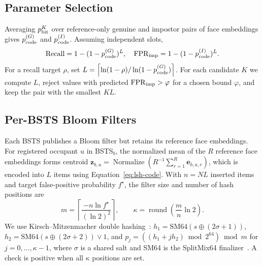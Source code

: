 \documentclass[pdflatex,sn-mathphys-num]{sn-jnl}%
\theoremstyle{thmstyleone}%
\theoremstyle{thmstyletwo}%
\theoremstyle{thmstylethree}%
\begin{document}
\subsection{Parameter Selection}
Averaging $p_{\rm bit}^K$ over reference-only genuine and impostor pairs of face embeddings gives $p_{\rm code}^{(G)}$ and $p_{\rm code}^{(I)}$. Assuming independent slots,
\begin{equation}
\mathrm{Recall}=1-(1-p_{\rm code}^{(G)})^L,\quad
\mathrm{FPR}_{\rm imp}=1-(1-p_{\rm code}^{(I)})^L.
\label{eq:lsh-recall}
\end{equation}
For a recall target $\rho$, set $L=\left\lceil\ln(1-\rho)/\ln(1-p_{\rm code}^{(G)})\right\rceil$. For each candidate $K$ we compute $L$, reject values with predicted $\mathrm{FPR}_{\rm imp}>\varphi$ for a chosen bound $\varphi$, and keep the pair with the smallest $KL$.

\subsection{Per-BSTS Bloom Filters}
Each BSTS publishes a Bloom filter but retains its reference face embeddings. For registered occupant $u$ in BSTS$_b$, the normalized mean of the $R$ reference face embeddings forms centroid $\mathbf{z}_{b,u}=\operatorname{Normalize}(R^{-1}\sum_{r=1}^{R}\mathbf{e}_{b,u,r})$, which is encoded into $L$ items using Equation~\ref{eq:lsh-code}. With $n=NL$ inserted items and target false-positive probability $f^\star$, the filter size and number of hash positions are
\begin{equation}
m=\left\lceil\frac{-n\ln f^\star}{(\ln2)^2}\right\rceil,\qquad
\kappa=\operatorname{round}\!\left(\frac{m}{n}\ln2\right).
\label{eq:bloom-size}
\end{equation}
We use Kirsch--Mitzenmacher double hashing~\cite{kirsch2006}: $h_1=\mathrm{SM64}(s\oplus(2\sigma+1))$, $h_2=\mathrm{SM64}(s\oplus(2\sigma+2))\vee1$, and $p_j=((h_1+jh_2)\bmod2^{64})\bmod m$ for $j=0,\ldots,\kappa-1$, where $\sigma$ is a shared salt and SM64 is the SplitMix64 finalizer~\cite{steele2014}. A check is positive when all $\kappa$ positions are set.
\end{document}
